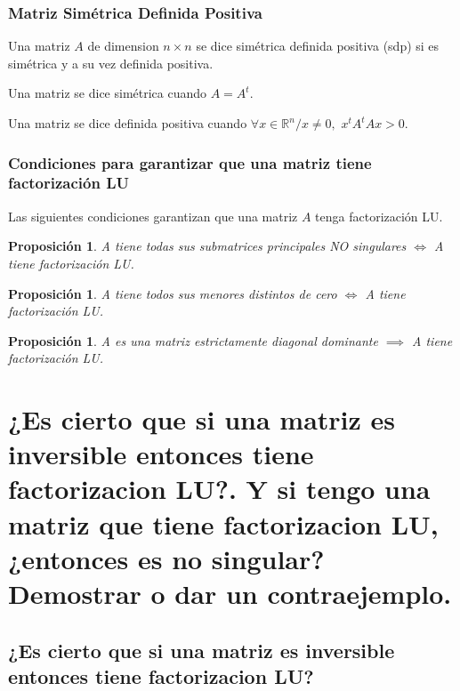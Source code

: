\documentclass[10pt,a4paper]{article}
\newtheorem{proposition}[theorem]{Proposición}
\newenvironment{definition}[1][Definición]{\begin{trivlist}
\item[\hskip \labelsep {\bfseries #1}]}{\end{trivlist}}
\begin{document}
\subsubsection{Matriz Simétrica Definida Positiva}

\begin{definition}
Una matriz $A$ de dimension $n \times n$ se dice simétrica definida positiva (sdp) si es simétrica y a su vez definida positiva.
\end{definition}

\begin{definition}
Una matriz se dice simétrica cuando $A = A^t$.
\end{definition}

\begin{definition}
Una matriz se dice definida positiva cuando $\forall x \in \mathbb{R}^n / x \neq 0,$ $x^tA^tAx > 0$.
\end{definition}

\subsubsection{Condiciones para garantizar que una matriz tiene factorización LU}

Las siguientes condiciones garantizan que una matriz $A$ tenga factorización LU.

\begin{proposition}
A tiene todas sus submatrices principales NO singulares $\iff$ A tiene factorización LU.
\end{proposition}

\begin{proposition}
A tiene todos sus menores distintos de cero $\iff$ A tiene factorización LU.
\end{proposition}

\begin{proposition}
A es una matriz estrictamente diagonal dominante $\implies$ A tiene factorización LU. 
\end{proposition}

\section{¿Es cierto que si una matriz es inversible entonces tiene factorizacion LU?. Y si tengo una matriz que tiene factorizacion LU, ¿entonces es no singular? Demostrar o dar un contraejemplo.}

\subsection{¿Es cierto que si una matriz es inversible entonces tiene factorizacion LU?}
\end{document}
